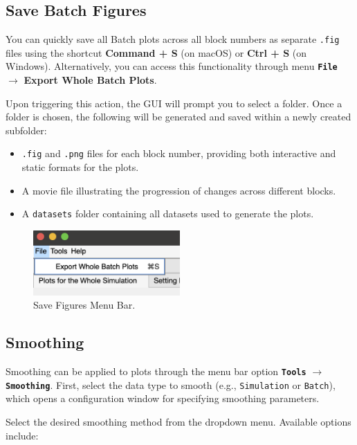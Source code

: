 \subsection{Save Batch Figures}

You can quickly save all Batch plots across all block numbers as separate \texttt{.fig} files using the shortcut \textbf{Command + S} (on macOS) or \textbf{Ctrl + S} (on Windows).
Alternatively, you can access this functionality through menu \textbf{\texttt{File}} $\rightarrow$ \textbf{Export Whole Batch Plots}.

Upon triggering this action, the GUI will prompt you to select a folder. Once a folder is chosen, the following will be generated and saved within a newly created subfolder:

\begin{itemize}
\item \texttt{.fig} and \texttt{.png} files for each block number, providing both interactive and static formats for the plots.
\item A movie file illustrating the progression of changes across different blocks.
\item A \texttt{datasets} folder containing all datasets used to generate the plots.
\end{itemize}

\begin{figure}[H]
    \centering
    \includegraphics[width=0.5\textwidth]{figs/save.png}
    \caption{Save Figures Menu Bar.}
    \label{fig:save}
\end{figure}
\subsection{Smoothing}
Smoothing can be applied to plots through the menu bar option \textbf{\texttt{Tools}} $\rightarrow$ \textbf{\texttt{Smoothing}}. First, select the data type to smooth (e.g., \texttt{Simulation} or \texttt{Batch}), which opens a configuration window for specifying smoothing parameters.

\noindent Select the desired smoothing method from the dropdown menu. Available options include:

